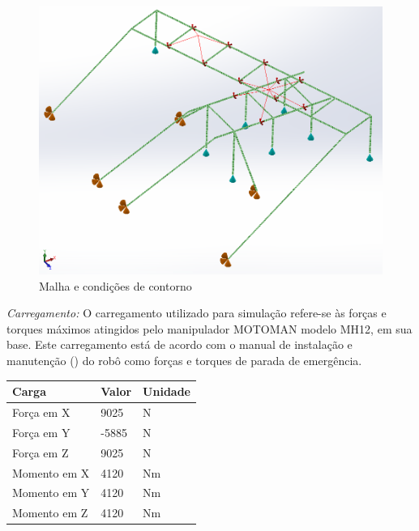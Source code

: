 \begin{figure}[h!]
	\centering
	\includegraphics[width=0.9\columnwidth]{figs/dimensionamento/contorno}
	\caption{Malha e condições de contorno}
    \label{fig::contorno}
\end{figure}

\textit{Carregamento:} O carregamento utilizado para simulação
refere-se às forças e torques máximos atingidos pelo manipulador MOTOMAN modelo MH12, em
sua base. Este carregamento está de acordo com o manual de instalação e
manutenção (\cite{MH12_manual}) do robô como forças e torques de parada de
emergência.

\begin{center}
\centering
\begin{tabular}{|l|l|l|}
\hline
\textbf{Carga}		   & \textbf{Valor} & \textbf{Unidade}   \\ \hline
Força em X		       & 9025           & N	                 \\ \hline
Força em Y			   & -5885          & N                  \\ \hline
Força em Z			   & 9025           & N                  \\ \hline
Momento em X		   & 4120           & Nm                 \\ \hline
Momento em Y		   & 4120           & Nm                 \\ \hline
Momento em Z		   & 4120           & Nm                 \\ \hline
\end{tabular}
\label{tab::carregamento}
\end{center}


